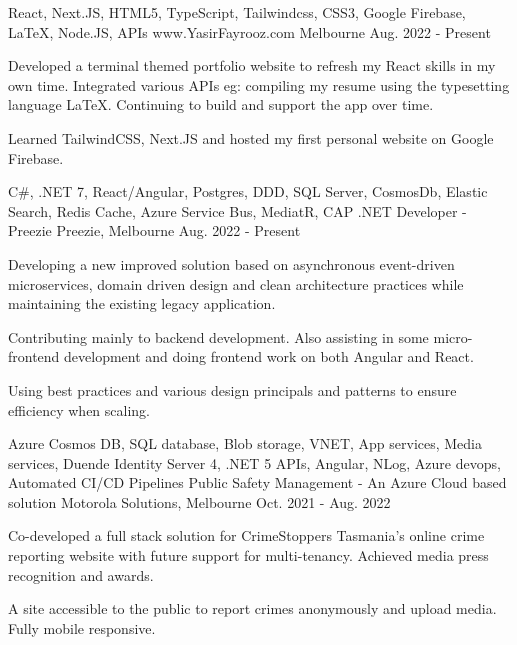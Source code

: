 

\vspace{-0.5\baselineskip}
\begin{cventries}
  \cventry
    {React, Next.JS, HTML5, TypeScript, Tailwindcss, CSS3, Google Firebase, LaTeX, Node.JS, APIs }
    {www.YasirFayrooz.com}
    {Melbourne}
    {Aug. 2022 - Present}
    {
      \begin{cvitems}
        \item {Developed a terminal themed portfolio website to refresh my React skills in my own time. Integrated various APIs eg: compiling my resume using the typesetting language LaTeX. Continuing to build and support the app over time.}
        \item {Learned TailwindCSS, Next.JS and hosted my first personal website on Google Firebase.}
      \end{cvitems}
    }
  \cventry
    {C\#, .NET 7, React/Angular, Postgres, DDD, SQL Server, CosmosDb, Elastic Search, Redis Cache, Azure Service Bus, MediatR, CAP}
    {.NET Developer - Preezie}
    {Preezie, Melbourne}
    {Aug. 2022 - Present}
    {
      \begin{cvitems}
        \item {Developing a new improved solution based on asynchronous event-driven microservices, domain driven design and clean architecture practices while maintaining the existing legacy application.}
        \item {Contributing mainly to backend development. Also assisting in some micro-frontend development and doing frontend work on both Angular and React.}
        \item {Using best practices and various design principals and patterns to ensure efficiency when scaling.}
	  \end{cvitems}
    }
  \cventry
    {Azure Cosmos DB, SQL database, Blob storage, VNET, App services, Media services, Duende Identity Server 4, .NET 5 APIs, Angular, NLog, Azure devops, Automated CI/CD Pipelines}
    {Public Safety Management - An Azure Cloud based solution}
    {Motorola Solutions, Melbourne}
    {Oct. 2021 - Aug. 2022}
    {
      \begin{cvitems}
        \item {Co-developed a full stack solution for CrimeStoppers Tasmania's online crime reporting website with future support for multi-tenancy. Achieved media press recognition and awards.}
        \item {A site accessible to the public to report crimes anonymously and upload media. Fully mobile responsive.}

\end{cvitems}}
\end{cventries}
